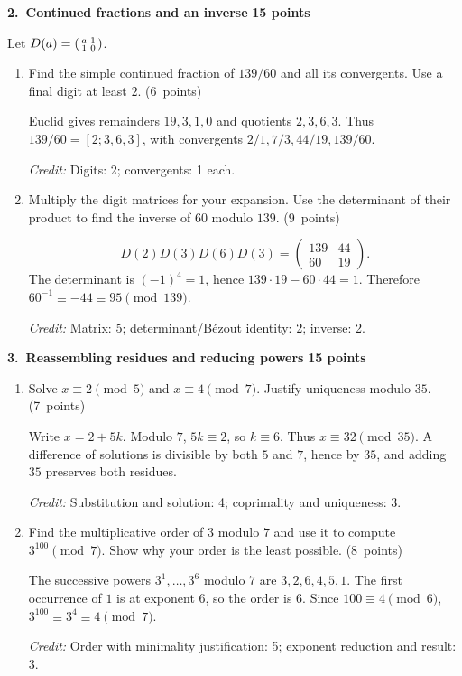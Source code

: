 \documentclass[11pt,letterpaper]{article}
\newcommand{\partpts}[1]{\unskip\nobreak\hspace{.3em}%
  \mbox{\small\color{muted}(#1 points)}}
\newcommand{\credit}[1]{\par{\footnotesize\color{muted}\textit{Credit:} #1}}
\newcommand{\problem}[3]{\par\addvspace{9pt}%
  {\large\bfseries\color{indigo}#1.\ #2}\hfill
  {\small\color{muted}\textbf{#3 points}}\par\nobreak}
\begin{document}
\problem{2}{Continued fractions and an inverse}{15}
Let $D(a)=\begin{psmallmatrix}a&1\\1&0\end{psmallmatrix}$.
\begin{enumerate}
\item Find the simple continued fraction of $139/60$ and all its
convergents. Use a final digit at least $2$. \partpts{6}
\begin{solution}[.85in]
Euclid gives remainders $19,3,1,0$ and quotients $2,3,6,3$.
Thus $139/60=[2;3,6,3]$, with convergents
$2/1,7/3,44/19,139/60$.
\credit{Digits: 2; convergents: 1 each.}
\end{solution}
\item Multiply the digit matrices for your expansion. Use the determinant
of their product to find the inverse of $60$ modulo $139$. \partpts{9}
\begin{solution}[1.05in]
\[
D(2)D(3)D(6)D(3)=\begin{pmatrix}139&44\\60&19\end{pmatrix}.
\]
The determinant is $(-1)^4=1$, hence $139\cdot19-60\cdot44=1$.
Therefore $60^{-1}\equiv-44\equiv95\pmod{139}$.
\credit{Matrix: 5; determinant/B\'ezout identity: 2; inverse: 2.}
\end{solution}
\end{enumerate}

\newpage
\problem{3}{Reassembling residues and reducing powers}{15}
\begin{enumerate}
\item Solve $x\equiv2\pmod5$ and $x\equiv4\pmod7$.
Justify uniqueness modulo $35$. \partpts{7}
\begin{solution}[1.25in]
Write $x=2+5k$. Modulo $7$, $5k\equiv2$, so $k\equiv6$.
Thus $x\equiv32\pmod{35}$. A difference of solutions is divisible by
both $5$ and $7$, hence by $35$, and adding $35$ preserves both residues.
\credit{Substitution and solution: 4; coprimality and uniqueness: 3.}
\end{solution}
\item Find the multiplicative order of $3$ modulo $7$ and use it to
compute $3^{100}\pmod7$. Show why your order is the least possible.
\partpts{8}
\begin{solution}[1.25in]
The successive powers $3^1,\ldots,3^6$ modulo $7$ are
$3,2,6,4,5,1$. The first occurrence of $1$ is at exponent $6$,
so the order is $6$. Since $100\equiv4\pmod6$,
$3^{100}\equiv3^4\equiv4\pmod7$.
\credit{Order with minimality justification: 5; exponent reduction and result: 3.}
\end{solution}
\end{enumerate}
\end{document}
